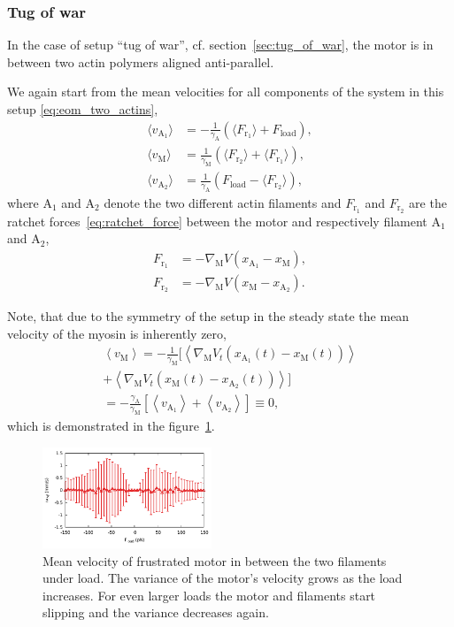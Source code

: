 \documentclass[aps,pre,twocolumn,showpacs,showkeys,superscriptaddress,floatfix]{revtex4-1}
\begin{document}
\subsubsection{Tug of war}
In the case of setup ``tug of war'', cf. section~\ref{sec:tug_of_war}, the motor is in between two actin polymers aligned anti-parallel. 

We again start from the mean velocities for all components of the system in this setup \eqref{eq:eom_two_actins},
\begin{align*}
\langle v_{\text{A}_1} \rangle &= - \frac{1}{\gamma_\text{A} } \left( \langle F_{\text{r}_1} \rangle + F_\text{load} \right) , \\
\langle v_\text{M} \rangle &= \frac{1}{\gamma_\text{M} } \left( \langle F_{\text{r}_2} \rangle + \langle F_{\text{r}_1} \rangle \right) , \\
\langle v_{\text{A}_2} \rangle &= \frac{1}{ \gamma_\text{A} } \left( F_\text{load} - \langle F_{\text{r}_2} \rangle \right) ,
\end{align*}
where ${\text{A}_1}$ and ${\text{A}_2}$ denote the two different actin filaments 
and $F_{\text{r}_1}$ and $F_{\text{r}_2}$ are the ratchet forces~\eqref{eq:ratchet_force} between the motor and respectively filament ${\text{A}_1}$ and ${\text{A}_2}$,
\begin{align*}
F_{\text{r}_1} &= - \nabla_\text{M} V( x_{\text{A}_1} - x_\text{M} ) , 
\\
F_{\text{r}_2} &= - \nabla_\text{M} V( x_\text{M} - x_{\text{A}_2} ) .
\end{align*} 

Note, that due to the symmetry of the setup in the steady state the mean velocity of the myosin is inherently zero,
\begin{multline*}
\left\langle v_\text{M} \right\rangle 
= - \frac{1}{\gamma_\text{M}} \bigl[ 
\left\langle \nabla_\text{M} V_t( x_{\text{A}_1}(t) - x_\text{M}(t) ) \right\rangle
\\ 
+ \left\langle \nabla_\text{M} V_t( x_\text{M}(t) - x_{\text{A}_2}(t) ) \right\rangle 
\bigr] 
\\
= - \frac{\gamma_\text{A}}{\gamma_\text{M}} \left[ 
\left\langle v_{\text{A}_1} \right\rangle 
+ \left\langle v_{\text{A}_2} \right\rangle 
\right]
\equiv 0 , 
\end{multline*}
which is demonstrated in the figure~\ref{fig:tug_F_motor}.
\begin{figure}[t]
\centering
\includegraphics[width=0.45\textwidth,height=!]{tug_F_motor}
\caption{\label{fig:tug_F_motor}
Mean velocity of frustrated motor in between the two filaments under load. 
The variance of the motor's velocity grows as the load increases. 
For even larger loads the motor and filaments start slipping and the variance decreases again.
}
\end{figure}
\end{document}
